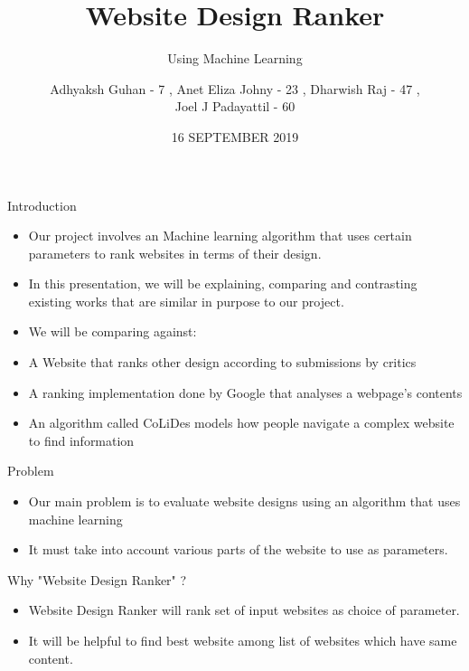 \documentclass[11pt]{beamer}
\begin{document}
	\title{\textbf{Website Design Ranker}}
	\subtitle{Using Machine Learning}
	\date{16 SEPTEMBER 2019}
	\author{{\scriptsize Adhyaksh Guhan - 7 , Anet Eliza Johny - 23 , Dharwish Raj - 47 , \\ Joel J Padayattil - 60}}
	\begin{frame}[plain]
		\maketitle
	\end{frame}
	\begin{frame}{Introduction}
		\begin{itemize}
			\item Our project involves an Machine learning algorithm that uses certain parameters to rank websites in terms of their design.
			
			\item In this presentation, we will be explaining, comparing and contrasting existing works that are similar in purpose to our project.
		
			\item We will be comparing against:
				\item A Website that ranks other design according to submissions by critics
				\item A ranking implementation done by Google that analyses a webpage's contents
				\item An algorithm called CoLiDes models how people navigate a complex website to find information
		\end{itemize}
	\end{frame}
	\begin{frame}{Problem}
		\begin{itemize}
			\item Our main problem is to evaluate website designs using an algorithm that uses machine learning
			\item It must take into account various parts of the website to use as parameters.
		\end{itemize}
	\end{frame}
	\begin{frame}{Why "Website Design Ranker" ?}
			\begin{itemize}
			\item Website Design Ranker will rank set of input websites as choice of parameter.
			\item It will be helpful to find best website among list of websites which have same content.

		\end{itemize}
	\end{frame}
\end{document}
